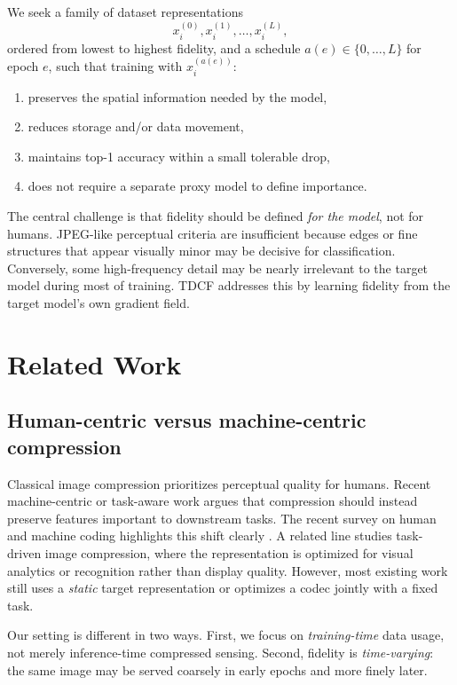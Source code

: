 \documentclass[10pt,twocolumn]{article}
\begin{document}
We seek a family of dataset representations
\begin{equation}
    x_i^{(0)}, x_i^{(1)}, \dots, x_i^{(L)},
\end{equation}
ordered from lowest to highest fidelity, and a schedule $a(e) \in \{0, \dots, L\}$ for epoch $e$, such that training with $x_i^{(a(e))}$:
\begin{enumerate}
    \item preserves the spatial information needed by the model,
    \item reduces storage and/or data movement,
    \item maintains top-1 accuracy within a small tolerable drop,
    \item does not require a separate proxy model to define importance.
\end{enumerate}

The central challenge is that fidelity should be defined \emph{for the model}, not for humans. JPEG-like perceptual criteria are insufficient because edges or fine structures that appear visually minor may be decisive for classification. Conversely, some high-frequency detail may be nearly irrelevant to the target model during most of training. TDCF addresses this by learning fidelity from the target model's own gradient field.

\section{Related Work}
\subsection{Human-centric versus machine-centric compression}
Classical image compression prioritizes perceptual quality for humans. Recent machine-centric or task-aware work argues that compression should instead preserve features important to downstream tasks. The recent survey on human and machine coding highlights this shift clearly \cite{huang2024survey}. A related line studies task-driven image compression, where the representation is optimized for visual analytics or recognition rather than display quality. However, most existing work still uses a \emph{static} target representation or optimizes a codec jointly with a fixed task.

Our setting is different in two ways. First, we focus on \emph{training-time} data usage, not merely inference-time compressed sensing. Second, fidelity is \emph{time-varying}: the same image may be served coarsely in early epochs and more finely later.
\end{document}
